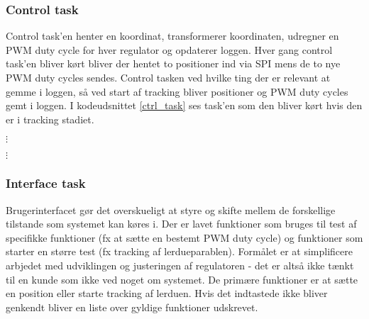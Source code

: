 \subsubsection{Control task}
\label{sec:control_task}
Control task'en henter en koordinat, transformerer koordinaten,
udregner en PWM duty cycle for hver regulator og opdaterer loggen.
Hver gang control task'en bliver kørt bliver der hentet to positioner
ind via SPI mens de to nye PWM duty cycles sendes.
Control tasken ved hvilke ting der er relevant at gemme i loggen,
så ved start af tracking bliver positioner og PWM duty cycles gemt i loggen.
I kodeudsnittet \ref{ctrl_task} ses task'en som den bliver kørt hvis den er i tracking stadiet.

\(\vdots\)

\(\vdots\)


\subsubsection{Interface task}
\label{sec:interface}
Brugerinterfacet gør det overskueligt at styre og skifte mellem de forskellige tilstande som systemet kan køres i.
Der er lavet funktioner som bruges til test af specifikke funktioner (fx at sætte en bestemt PWM duty cycle)
og funktioner som starter en større test (fx tracking af lerdueparablen).
Formålet er at simplificere arbjedet med udviklingen og justeringen af regulatoren -
det er altså ikke tænkt til en kunde som ikke ved noget om systemet.
De primære funktioner er at sætte en position eller starte tracking af lerduen.
Hvis det indtastede ikke bliver genkendt bliver en liste over gyldige funktioner udskrevet.

